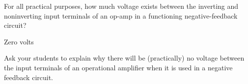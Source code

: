 

For all practical purposes, how much voltage exists between the inverting and noninverting input terminals of an op-amp in a functioning negative-feedback circuit?







Zero volts







Ask your students to explain why there will be (practically) no voltage between the input terminals of an operational amplifier when it is used in a negative feedback circuit.




